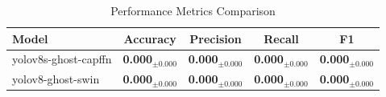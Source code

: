 
\begin{table}[htbp]
\centering
\caption{Performance Metrics Comparison}
\label{tab:performance}
\begin{tabular}{lcccc}
\toprule
\textbf{Model} & \textbf{Accuracy} & \textbf{Precision} & \textbf{Recall} & \textbf{F1} \\
\midrule
yolov8s-ghost-capffn & \textbf{0.000$_{\pm0.000}$} & \textbf{0.000$_{\pm0.000}$} & \textbf{0.000$_{\pm0.000}$} & \textbf{0.000$_{\pm0.000}$} \\
yolov8-ghost-swin & \textbf{0.000$_{\pm0.000}$} & \textbf{0.000$_{\pm0.000}$} & \textbf{0.000$_{\pm0.000}$} & \textbf{0.000$_{\pm0.000}$} \\

\bottomrule
\end{tabular}
\end{table}
